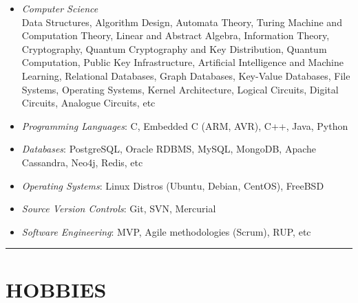 \documentclass[10pt,a4paper]{article}
\begin{document}
\begin{itemize}
  \item \small \textit {Computer Science} \\
  Data Structures, Algorithm Design, Automata Theory, Turing Machine and Computation Theory, Linear and Abstract Algebra, Information Theory, Cryptography, Quantum Cryptography and Key Distribution, Quantum Computation, Public Key Infrastructure, Artificial Intelligence and Machine Learning,  Relational Databases, Graph Databases, Key-Value Databases, File Systems, Operating Systems, Kernel Architecture, Logical Circuits, Digital Circuits, Analogue Circuits, etc
  \item \small \textit {Programming Languages}:
  C, Embedded C (ARM, AVR), C++, Java, Python
  \item \small \textit {Databases}:
  PostgreSQL, Oracle RDBMS, MySQL, MongoDB, Apache Cassandra, Neo4j, Redis, etc
  \item \small \textit {Operating Systems}:
  Linux Distros (Ubuntu, Debian, CentOS), FreeBSD
  \item \small \textit {Source Version Controls}:
  Git, SVN, Mercurial
  \item \small \textit {Software Engineering}:
  MVP, Agile methodologies (Scrum), RUP, etc
\end{itemize}

\rule {14cm}{0.4pt}

\section{HOBBIES}
\end{document}

